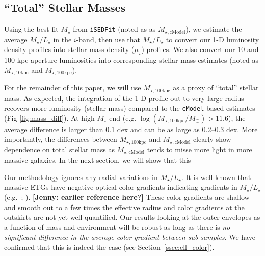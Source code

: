 \documentclass[a4paper,fleqn,usenatbib]{mnras}
\def\cmodel{\texttt{cModel}}
\def\rbcg{\texttt{cenHighMh}}
\def\nbcg{\texttt{cenLowMh}}
\def\mstar{{$M_{\star}$}}
\def\minn{{$M_{\star,10\mathrm{kpc}}$}}
\def\mtot{{$M_{\star,100\mathrm{kpc}}$}}
\def\mcmodel{{$M_{\star,\mathrm{cModel}}$}}
\def\logmtot{{$\log (M_{\star,100\mathrm{kpc}}/M_{\odot})$}}
\def\m2l{{$M_{\star}/L_{\star}$}}
\def\mden{{$\mu_{\star}$}}
\newcommand{\jenny}[1]{\textcolor{Bittersweet}{\textbf{[Jenny: #1]}}}
\begin{document}

\subsection{``Total'' Stellar Masses}
    \label{ssec:mtotal}
    
    Using the best-fit \mstar{} from \texttt{iSEDFit} (noted as as \mcmodel{}), 
    we estimate the average \m2l{} in the $i$-band, then use that \m2l{} to convert 
    our 1-D luminosity density profiles into stellar mass density (\mden{}) profiles. 
    We also convert our 10 and 100 kpc aperture luminosities into corresponding stellar 
    mass estimates (noted as \minn{} and \mtot{}).

    For the remainder of this paper, we will use \mtot{} as a proxy of ``total'' 
    stellar mass. 
    As expected, the integration of the 1-D profile out to very large radius recovers 
    more luminosity (stellar mass) compared to the \cmodel{}-based estimates 
    (Fig \ref{fig:mass_diff}).
    At high-\mstar{} end (e.g. \logmtot{}$>11.6$), the average difference is larger 
    than 0.1 dex and can be as large as 0.2--0.3 dex.  
    More importantly, the differences between \mtot{} and \mcmodel{} clearly show 
    dependence on total stellar mass as \mcmodel{} tends to misse more light in 
    more massive galaxies.  
    In the next section, we will show that this 

    Our methodology ignores any radial variations in \m2l{}. 
    It is well known that massive ETGs have negative optical color gradients 
    indicating gradients in \m2l{} (e.g.\ \citealt{LaBarbera2012}; 
    \citealt{DSouza2015}). \jenny{earlier reference here?}
    These color gradients are shallow and smooth out to a few times the effective 
    radius and color gradients at the outskirts are not yet well quantified.
    Our results looking at the outer envelopes as a function of mass and environment 
    will be robust as long as there is \emph{no significant difference in 
    the average color gradient between sub-samples}.
    We have confirmed that this is indeed the case (see Section~\ref{ssec:ell_color}). 
    
\end{document}

